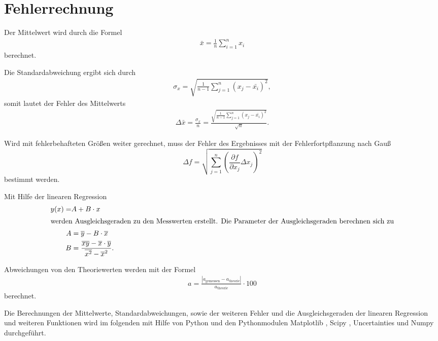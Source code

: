 \section{Fehlerrechnung}
\label{sec:Fehlerrechnung}

Der Mittelwert wird durch die Formel
\begin{align*}
    \bar{x}=\frac{1}{n} \sum_{i=1}^n x_i \label{eqn:Mittelwert}
\end{align*}
berechnet.

Die Standardabweichung ergibt sich durch
\begin{align*}
    \sigma_x=\sqrt{\frac{1}{n-1}\sum_{j=1}^n (x_j-\bar{x_i})^2},
\end{align*}
somit lautet der Fehler des Mittelwerts
\begin{align*}
    \Delta \bar{x}= \frac{\sigma_x}{n} = \frac{\sqrt{\frac{1}{n-1}\sum_{j=1}^n (x_j-\bar{x_i})^2}}{\sqrt{n}}.
\end{align*}

Wird mit fehlerbehafteten Größen weiter gerechnet, muss der Fehler des Ergebnisses mit der Fehlerfortpflanzung nach Gauß
\begin{equation*}
    \Delta f=\sqrt{\sum_{j=1}^n \left(\frac{\partial f}{\partial x_j}\Delta x_j \right)^{2} }\label{eqn:Gauß}
\end{equation*}
bestimmt werden.

Mit Hilfe der linearen Regression 
\begin{subequations}
    \label{eqn:lin}
\begin{align}
    y(x)=&A+B\cdot x\\
    \intertext{werden Ausgleichsgeraden zu den Messwerten erstellt. Die Parameter der Ausgleichsgeraden berechnen sich zu}
    A&=\overline{y}-B\cdot \overline{x}\label{eqn:lina}\\
    B&=\frac{\overline{xy}-\overline{x}\cdot \overline{y}}{\overline{x^2}-\overline{x}^2}\label{eqn:linb}.
\end{align}
\end{subequations}

Abweichungen von den Theoriewerten werden mit der Formel
\begin{align}
  a=\frac{|a_\mathrm{gemessen}-a_\mathrm{theorie}|}{a_\mathrm{theorie}}\cdot 100 \label{eqn:abweich}
\end{align}
berechnet.

Die Berechnungen der Mittelwerte, Standardabweichungen, sowie der weiteren Fehler und die Ausgleichsgeraden der linearen Regression und weiteren Funktionen
wird im folgenden mit Hilfe von Python und den Pythonmodulen Matplotlib \cite{matplotlib}, Scipy \cite{scipy}, Uncertainties \cite{uncertainties} und Numpy \cite{numpy}
durchgeführt.
